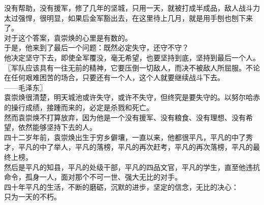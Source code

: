 \begin{multicols}{\theparacolNo}
没有帮助，没有援军，修了几年的坚城，只用一天，就被打成半成品，敌人战斗力太过强悍，很明显，如果后金军豁出去，在这里待上几月，就是用手刨也刨下来了。\\

对于这个答案，袁崇焕的心里是有数的。\\

于是，他来到了最后一个问题：既然必定失守，还守不守？\\

他决定坚守下去，即使全军覆没，毫无希望，也要坚持到底，坚持到最后一个人。\\

〖军队应该具有一往无前的精神，它要压倒一切敌人，而决不被敌人所屈服。不论在任何艰难困苦的场合，只要还有一个人，这个人就要继续战斗下去。\\

——毛泽东〗\\

袁崇焕很清楚，明天城池或许失守，或许不失守，但终究是要失守的。以努尔哈赤的操行成绩，接踵而来的，必定是杀戮和死亡。\\

然而袁崇焕不打算放弃，因为他是一个没有援军、没有粮食、没有理想、没有希望，依然能够坚持下去的人。\\

四十二岁年前，袁崇焕出生于穷乡僻壤，一直以来，他都很平凡，平凡的中了秀才，平凡的中了举人，平凡的落榜，平凡的再次赶考，平凡的再次落榜，平凡的最终上榜。\\

然后是平凡的知县，平凡的处级干部，平凡的四品文官，平凡的学生，直至他违抗命令，孤身一人，面对那个不可一世、强大无比的对手。\\

四十年平凡的生活，不断的磨砺，沉默的进步，坚定的信念，无比的决心：\\

只为一天的不朽。\\

\ifnum{}
	\end{multicols}
\fi
\newpage
